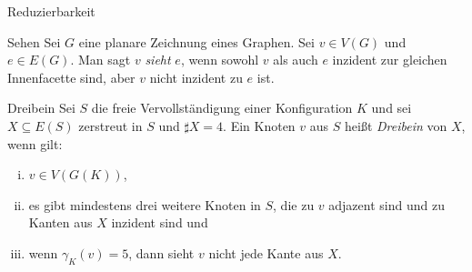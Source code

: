 \begin{section}{Reduzierbarkeit}
 \begin{definition}{Sehen}
  Sei $G$ eine planare Zeichnung eines Graphen. Sei $v \in V(G)$ und $e \in E(G)$. Man sagt $v$ \textit{sieht} $e$, wenn sowohl $v$ als auch $e$ inzident zur gleichen Innenfacette sind, aber $v$ nicht inzident zu $e$ ist.
 \end{definition}

 \begin{definition}{Dreibein}
  Sei $S$ die freie Vervollständigung einer Konfiguration $K$ und sei $X \subseteq E(S)$ zerstreut in $S$ und $\sharp X = 4$. Ein Knoten $v$ aus $S$ heißt \textit{Dreibein} von $X$, wenn gilt:
  \begin{enumerate}[(i)]
   \item $v \in V(G(K))$,
   \item es gibt mindestens drei weitere Knoten in $S$, die zu $v$ adjazent sind und zu Kanten aus $X$ inzident sind und
   \item wenn $\gamma_K(v) = 5$, dann sieht $v$ nicht jede Kante aus $X$.
  \end{enumerate}
 \end{definition}
 

\end{section}
